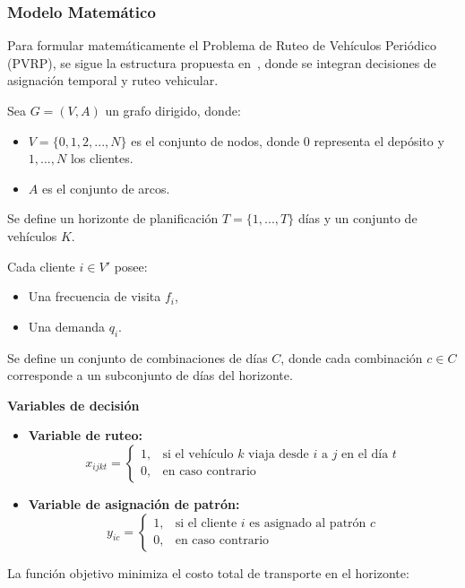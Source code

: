 \subsubsection{Modelo Matemático} \label{sec:ModeloMatematico}
Para formular matemáticamente el Problema de Ruteo de Vehículos Periódico (PVRP), se sigue la estructura propuesta en~\cite{Coene2010}, donde se integran decisiones de asignación temporal y ruteo vehicular.

Sea $G = (V, A)$ un grafo dirigido, donde:
\begin{itemize}
    \item $V = \{0, 1, 2, ..., N\}$ es el conjunto de nodos, donde $0$ representa el depósito y $1,...,N$ los clientes.
    \item $A$ es el conjunto de arcos.
\end{itemize}

Se define un horizonte de planificación $T = \{1, ..., T\}$ días y un conjunto de vehículos $K$.

Cada cliente $i \in V'$ posee:
\begin{itemize}
    \item Una frecuencia de visita $f_i$,
    \item Una demanda $q_i$.
\end{itemize}

Se define un conjunto de combinaciones de días $C$, donde cada combinación $c \in C$ corresponde a un subconjunto de días del horizonte.

\textbf{Variables de decisión}

\begin{itemize}
    \item \textbf{Variable de ruteo:}
\[
x_{ijkt} =
\begin{cases}
1, & \text{si el vehículo } k \text{ viaja desde } i \text{ a } j \text{ en el día } t \\
0, & \text{en caso contrario}
\end{cases}
\]

    \item \textbf{Variable de asignación de patrón:}
\[
y_{ic} =
\begin{cases}
1, & \text{si el cliente } i \text{ es asignado al patrón } c \\
0, & \text{en caso contrario}
\end{cases}
\]
\end{itemize}

La función objetivo minimiza el costo total de transporte en el horizonte:

